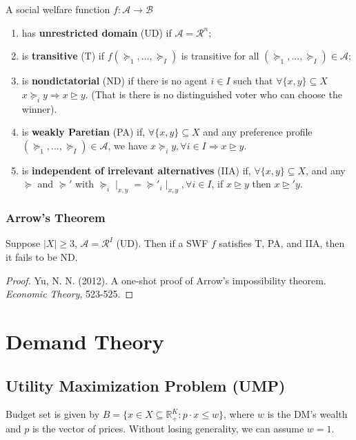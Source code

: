 \documentclass[11pt]{elegantbook}
\begin{document}
\begin{definition}\label{SWF_properties}
    \normalfont
    A social welfare function $f: \mathcal{A}\rightarrow \mathcal{B}$
    \begin{enumerate}[$\circ$]
        \item has \textbf{unrestricted domain} (UD) if $\mathcal{A}=\mathcal{R}^n$;
        \item is \textbf{transitive} (T) if $f(\succeq_1,...,\succeq_I)$ is transitive for all $(\succeq_1,...,\succeq_I)\in \mathcal{A}$;
        \item is \textbf{nondictatorial} (ND) if there is no agent $i\in I$ such that $\forall \{x,y\}\subseteq X$ $x\succeq_i y \Rightarrow x\trianglerighteq y$. (That is there is no distinguished voter who can choose the winner).
        \item is \textbf{weakly Paretian} (PA) if, $\forall \{x,y\}\subseteq X$ and any preference profile $(\succeq_1,...,\succeq_I)\in \mathcal{A}$, we have $x\succeq_i y,\forall i\in I \Rightarrow x\trianglerighteq y$.
        \item is \textbf{independent of irrelevant alternatives} (IIA) if, $\forall \{x,y\}\subseteq X$, and any $\succeq$ and $\succeq'$ with $\succeq_i\mid_{x,y}=\succeq'_i\mid_{x,y}, \forall i\in I$, if $x\trianglerighteq y$ then $x\trianglerighteq' y$.
    \end{enumerate}
\end{definition}


\subsection{Arrow's Theorem}
\begin{theorem}
    Suppose $|X|\geq 3$, $\mathcal{A}=\mathcal{R}^I$ (UD). Then if a SWF $f$ satisfies T, PA, and IIA, then it fails to be ND.
\end{theorem}
\begin{proof}
    \normalfont
    Yu, N. N. (2012). A one-shot proof of Arrow's impossibility theorem. \textit{Economic Theory}, 523-525.
\end{proof}



\chapter{Demand Theory}
\section{Utility Maximization Problem (UMP)}
Budget set is given by $B=\{x\in X\subseteq \mathbb{R}_+^K: p\cdot x\leq w\}$, where $w$ is the DM's wealth and $p$ is the vector of prices. Without losing generality, we can assume $w=1$.
\end{document}
